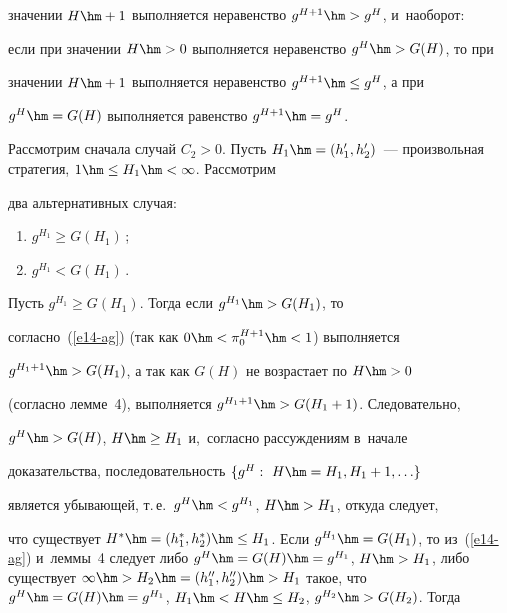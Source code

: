 значении $H\hm+1$ выполняется неравенство $g^{H+1}\hm>g^H$, и~наоборот: 


если при значении $H\hm>0$ выполняется неравенство $g^H\hm> G(H)$, то при 


значении $H\hm+1$ выполняется неравенство $g^{H+1}\hm\leq g^H$, а при 


$g^H\hm= G(H)$ выполняется равенство $g^{H+1}\hm= g^H$. 


  


  Рассмотрим сначала случай $C_2>0$. Пусть $H_1\hm= (h_1^\prime, 


h_2^\prime)$~--- произвольная стратегия, $1\hm\leq H_1\hm<\infty$. Рассмотрим 


два альтернативных случая: 


  \begin{enumerate}[(1)]


  \item $g^{H_1}\geq G(H_1)$\,;


  \item $g^{H_1}<G(H_1)$\,.


  \end{enumerate}


  


  Пусть $g^{H_1}\geq G(H_1)$. Тогда если  $g^{H_1}\hm> G(H_1)$, то 


согласно~(\ref{e14-ag}) (так как $0\hm< \pi_0^{H+1}\hm<1$) выполняется 


$g^{H_1+1}\hm> G(H_1)$, а так как $G(H)$ не возрастает по $H\hm>0$ 


(согласно лемме~4), выполняется $g^{H_1+1}\hm> G(H_1+1)$. Следовательно, 


$g^H\hm> G(H)$, $H\hm\geq H_1$ и,~согласно рассуждениям в~начале 


доказательства, последовательность $\{ g^H:\ H\hm= H_1,  H_1+1,\ldots\}$ 


является убывающей, т.\,е.\ $g^H\hm< g^{H_1}$, $H\hm> H_1$, откуда следует, 


что существует $H^*\hm= (h_1^*,h_2^*)\hm\leq H_1$. Если $g^{H_1}\hm= 


G(H_1)$, то из~(\ref{e14-ag}) и~леммы~4 следует либо $g^H\hm=G(H)\hm= 


g^{H_1}$, $H\hm>H_1$, либо существует $\infty \hm> H_2\hm= 


(h_1^{\prime\prime},h_2^{\prime\prime})\hm> H_1$ такое, что $g^H\hm= G(H) 


\hm= g^{H_1}$, $H_1\hm< H\hm\leq H_2$, $g^{H_2}\hm> G(H_2)$. Тогда 


